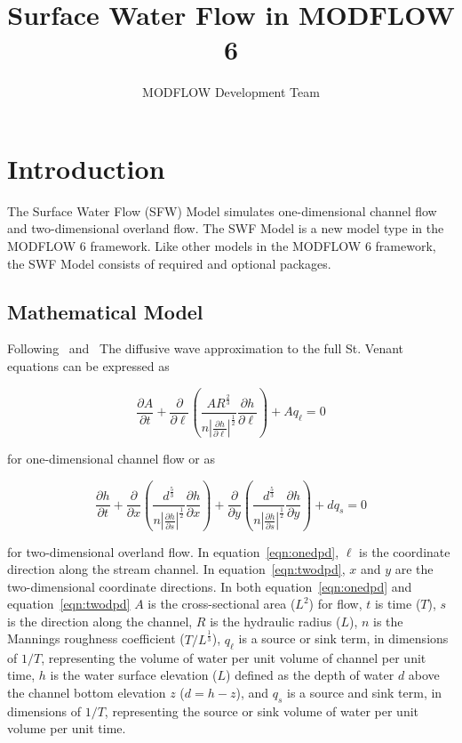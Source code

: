 \documentclass[fleqn]{article}
\author{MODFLOW Development Team}
\begin{document}
\title{Surface Water Flow in MODFLOW 6}
\maketitle

\tableofcontents

\section{Introduction}
The Surface Water Flow (SFW) Model simulates one-dimensional channel flow and two-dimensional overland flow.  The SWF Model is a new model type in the MODFLOW 6 framework.  Like other models in the MODFLOW 6 framework, the SWF Model consists of required and optional packages.

\subsection{Mathematical Model}
Following~\cite{panday2004} and~\cite{hughes2012documentation} The diffusive wave approximation to the full St. Venant equations can be expressed as

\begin{equation}
  \frac{\partial A}{\partial t} +
  \frac{\partial}{\partial \ell}
  \left (
  \frac{A R^{\frac{2}{3}}}{n \left | \frac{\partial h}{\partial \ell} \right |^{\frac{1}{2}} } \frac{\partial h}{\partial \ell}
  \right )
  + A q_{\ell}
  = 0
  \label{eqn:onedpd}
\end{equation}

\noindent for one-dimensional channel flow or as

\begin{equation}
  \frac{\partial h}{\partial t}
  + \frac{\partial}{\partial x}
  \left (
  \frac{d^{\frac{5}{3}}}{n \left | \frac{\partial h}{\partial s} \right |^{\frac{1}{2}} } \frac{\partial h}{\partial x}
  \right )
  + \frac{\partial}{\partial y}
  \left (
  \frac{d^{\frac{5}{3}}}{n \left | \frac{\partial h}{\partial s} \right |^{\frac{1}{2}} } \frac{\partial h}{\partial y}
  \right )
  + d q_s
  = 0
  \label{eqn:twodpd}
\end{equation}

\noindent for two-dimensional overland flow.  In equation~\ref{eqn:onedpd}, $\ell$ is the coordinate direction along the stream channel.  In equation~\ref{eqn:twodpd}, $x$ and $y$ are the two-dimensional coordinate directions. In both equation~\ref{eqn:onedpd} and equation~\ref{eqn:twodpd} $A$ is the cross-sectional area ($L^2$) for flow, $t$ is time ($T$), $s$ is the direction along the channel, $R$ is the hydraulic radius ($L$), $n$ is the Mannings roughness coefficient ($T/L^{\frac{1}{3}}$), $q_{\ell}$ is a source or sink term, in dimensions of $1/T$, representing the volume of water per unit volume of channel per unit time, $h$ is the water surface elevation ($L$) defined as the depth of water $d$ above the channel bottom elevation $z$ ($d = h - z$), and $q_s$ is a source and sink term, in dimensions of $1/T$, representing the source or sink volume of water per unit volume per unit time.
\end{document}
